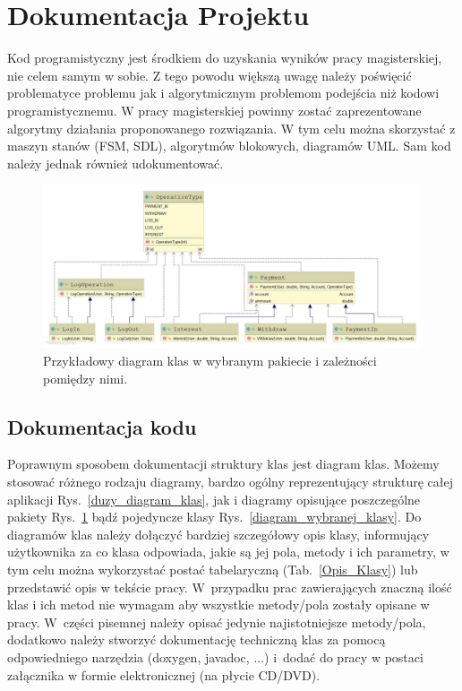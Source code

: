\documentclass[12pt,a4paper]{article}
\begin{document}
\section{Dokumentacja Projektu}\label{dokumentacja}

Kod programistyczny jest środkiem do uzyskania wyników pracy magisterskiej, nie celem samym w sobie. Z tego powodu większą uwagę należy poświęcić problematyce problemu jak i algorytmicznym problemom podejścia niż kodowi programistycznemu. W pracy magisterskiej powinny zostać zaprezentowane algorytmy działania proponowanego rozwiązania. W tym celu można skorzystać z maszyn stanów (FSM, SDL), algorytmów blokowych, diagramów UML. Sam kod należy jednak również udokumentować.

\begin{figure}[h]
\centering
\includegraphics[width = \textwidth]{DiagramKlasPakiet.jpg}
\caption{Przykładowy diagram klas w wybranym pakiecie i zależności pomiędzy nimi.}\label{diagram_klas_pakiet}
\end{figure}

\subsection{Dokumentacja kodu}
 Poprawnym sposobem dokumentacji struktury klas jest diagram klas. Możemy stosować różnego rodzaju diagramy, bardzo ogólny reprezentujący strukturę całej aplikacji Rys.~\ref{duzy_diagram_klas}, jak i diagramy opisujące poszczególne pakiety Rys.~\ref{diagram_klas_pakiet} bądź pojedyncze klasy Rys.~\ref{diagram_wybranej_klasy}. Do diagramów klas należy dołączyć bardziej szczegółowy opis klasy, informujący użytkownika za co klasa odpowiada, jakie są jej pola, metody i ich parametry, w tym celu można wykorzystać postać tabelaryczną (Tab.~\ref{Opis_Klasy}) lub przedstawić opis w tekście pracy. W~przypadku prac zawierających znaczną ilość klas i ich metod nie wymagam aby wszystkie metody/pola zostały opisane w pracy. W~części  pisemnej należy opisać jedynie najistotniejsze metody/pola, dodatkowo należy stworzyć dokumentację techniczną klas za pomocą odpowiedniego narzędzia (doxygen, javadoc, ...) i~dodać do pracy w postaci załącznika w formie elektronicznej (na płycie CD/DVD).
\end{document}
